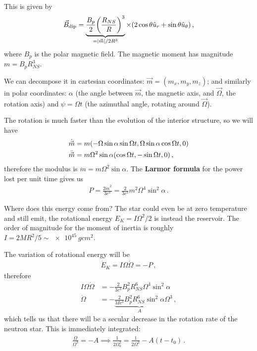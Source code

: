 \documentclass[main.tex]{subfiles}
\begin{document}
This is given by 
%
\begin{align}
\vec{B} _{\text{dip}} = \underbrace{\frac{B_p}{2} \qty( \frac{R_{NS}}{R})^3}_{= \abs{\vec{m}} / 2R^3}
\times \qty(2 \cos \theta \hat{u}_r + \sin \theta \hat{u}_\theta )
\,,
\end{align}
%
where \(B_p\) is the polar magnetic field. 
The magnetic moment has magnitude \(m = B_p R_{NS}^3\). 

We can decompose it in cartesian coordinates: \(\vec{m} = (m_x, m_y, m_z)\); and similarly in polar coordinates: \(\alpha \) (the angle between \(\vec{m}\), the magnetic axis, and \(\vec{\Omega}\), the rotation axis) and \(\psi = \Omega t\) (the azimuthal angle, rotating around \(\vec{\Omega}\)). 

The rotation is much faster than the evolution of the interior structure, so we will have 
%
\begin{align}
\dot{\vec{m}} &= m \qty(- \Omega \sin \alpha \sin \Omega t, \Omega \sin \alpha \cos \Omega t , 0)  \\
\ddot{\vec{m}} &= m \Omega^2 \sin \alpha \qty(\cos \Omega t, - \sin \Omega t, 0) 
\,,
\end{align}
%
therefore the modulus is \(\ddot{m} = m \Omega^2 \sin \alpha \). 
The \textbf{Larmor formula} for the power lost per unit time gives us 
%
\begin{align}
P = \frac{2 \ddot{m}^2}{3 c^3} = \frac{2}{3 c^3} m^2 \Omega^{4} \sin^2 \alpha 
\,.
\end{align}

Where does this energy come from? The star could even be at zero temperature and still emit, the rotational energy \(E_K = I \Omega^2 /2\) is instead the reservoir. 
The order of magnitude for the moment of inertia is roughly \(I = 2 M R^2 /5 \sim \SI{e45}{g cm^2}\). 

The variation of rotational energy will be 
%
\begin{align}
\dot{E}_K = I \Omega \dot{\Omega} = - P 
\,,
\end{align}
%
therefore 
%
\begin{align}
I \Omega \dot{\Omega} &= - \frac{2}{3c^3} B_p^2R_{NS}^{6} \Omega^{4} \sin^2\alpha   \\
\dot{\Omega} &= - \underbrace{\frac{2}{3 I c^3} B_p^2R_{NS}^{6} \sin^2\alpha}_{A} \Omega^{3} 
\,,
\end{align}
%
which tells us that there will be a secular decrease in the rotation rate of the neutron star. This is immediately integrated: 
%
\begin{align}
\frac{\dot{\Omega}}{\Omega^3} = - A \implies
\frac{1}{2 \Omega_0^2} = \frac{1}{2 \Omega^2} - A(t - t_0 ) 
\,.
\end{align}
\end{document}
